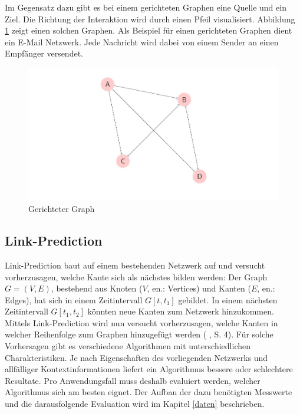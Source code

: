 Im Gegensatz dazu gibt es bei einem gerichteten Graphen eine Quelle und ein Ziel. Die Richtung der Interaktion wird durch einen Pfeil visualisiert.
Abbildung \ref{fig:graph_directed} zeigt einen solchen Graphen.
Als Beispiel für einen gerichteten Graphen dient ein E-Mail Netzwerk. Jede Nachricht wird dabei von einem Sender an einen Empfänger versendet.

\begin{figure}[h]
    \centering
    \includegraphics[scale=0.7]{resources/graph_directed.JPG}
    \caption{Gerichteter Graph}
    \label{fig:graph_directed}
\end{figure}

\subsection{Link-Prediction}
Link-Prediction baut auf einem bestehenden Netzwerk auf und versucht vorherzusagen, welche Kante sich als nächstes bilden werden:
Der Graph $G = (V, E)$, bestehend aus Knoten ($V$, en.: Vertices) und Kanten ($E$, en.: Edges), hat sich in einem Zeitintervall $G[t, t_1]$ gebildet.
In einem nächsten Zeitintervall $G[t_1, t_2]$ könnten neue Kanten zum Netzwerk hinzukommen.
Mittels Link-Prediction wird nun versucht vorherzusagen, welche Kanten in welcher Reihenfolge zum Graphen hinzugefügt werden (\citeauthor{gao_link_2015} \citeyear{citeauthor}, S. 4).
Für solche Vorhersagen gibt es verschiedene Algorithmen mit unterschiedlichen Charakteristiken.
Je nach Eigenschaften des vorliegenden Netzwerks und allfälliger Kontextinformationen liefert ein Algorithmus bessere oder schlechtere Resultate.
Pro Anwendungsfall muss deshalb evaluiert werden, welcher Algorithmus sich am besten eignet.
Der Aufbau der dazu benötigten Messwerte und die darausfolgende Evaluation wird im Kapitel \ref{daten} beschrieben.
